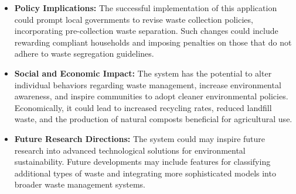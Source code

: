 \begin{itemize}
	\item \textbf{Policy Implications:} The successful implementation of this application could prompt local governments to revise waste collection policies, incorporating pre-collection waste separation. Such changes could include rewarding compliant households and imposing penalties on those that do not adhere to waste segregation guidelines.
	
	\item \textbf{Social and Economic Impact:} The system has the potential to alter individual behaviors regarding waste management, increase environmental awareness, and inspire communities to adopt cleaner environmental policies. Economically, it could lead to increased recycling rates, reduced landfill waste, and the production of natural composts beneficial for agricultural use.
	
	\item \textbf{Future Research Directions:} The system could may inspire future research into advanced technological solutions for environmental sustainability. Future developments may include features for classifying additional types of waste and integrating more sophisticated models into broader waste management systems.
\end{itemize}